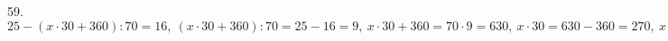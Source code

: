 59. $25-(x\cdot30+360):70=16,\ (x\cdot30+360):70=25-16=9,\ x\cdot30+360=70\cdot9=630,\ x\cdot30=630-360=270,\ x=270:30=9.$\\
